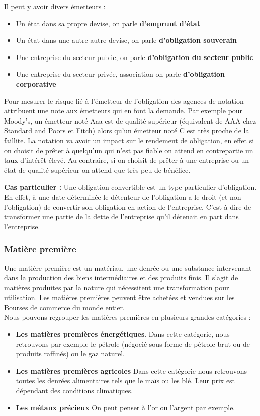 Il peut y avoir divers émetteurs :
\begin{itemize}
\item Un état dans sa propre devise, on parle \textbf{d'emprunt d'état}
\item Un état dans une autre autre devise, on parle \textbf{d'obligation souverain}
\item Une entreprise du secteur public, on parle \textbf{d'obligation du secteur public}
\item Une entreprise du secteur privée, association on parle \textbf{d'obligation corporative}
\end{itemize}

Pour mesurer le risque lié à l'émetteur de l'obligation des agences de notation attribuent une note aux émetteurs qui en font la demande. Par exemple pour Moody's, un émetteur noté Aaa est de qualité supérieur (équivalent de AAA chez Standard and Poors et Fitch) alors qu'un émetteur noté C est très proche de la faillite. La notation va avoir un impact sur le rendement de obligation, en effet si on choisit de prêter à quelqu'un qui n'est pas fiable on attend en contrepartie un taux d'intérêt élevé. Au contraire, si on choisit de prêter à une entreprise ou un état de qualité supérieur on attend que très peu de bénéfice. 

\textbf{Cas particulier : } Une obligation convertible est un type particulier d'obligation. En effet, à une date déterminée le détenteur de l'obligation a le droit (et non l'obligation) de convertir son obligation en action de l'entreprise. C'est-à-dire de transformer une partie de la dette de l'entreprise qu'il détenait en part dans l'entreprise. 

\subsubsection{Matière première}
Une matière première est un matériau, une denrée ou une substance intervenant dans la production des biens intermédiaires et des produits finis. Il s'agit de matières produites par la nature qui nécessitent une transformation pour utilisation. Les matières premières peuvent être achetées et vendues sur les Bourses de commerce du monde entier.\\

Nous pouvons regrouper les matières premières en plusieurs grandes catégories :\\
\begin{itemize}
\item \textbf{Les matières premières énergétiques}. Dans cette catégorie, nous retrouvons par exemple le pétrole (négocié sous forme de pétrole brut ou de produits raffinés) ou le gaz naturel. 
\item \textbf{Les matières premières agricoles} Dans cette catégorie nous retrouvons toutes les denrées alimentaires tels que le maïs ou les blé. Leur prix est dépendant des conditions climatiques.
\item \textbf{Les métaux précieux} On peut penser à l'or ou l'argent par exemple. 
\end{itemize}


